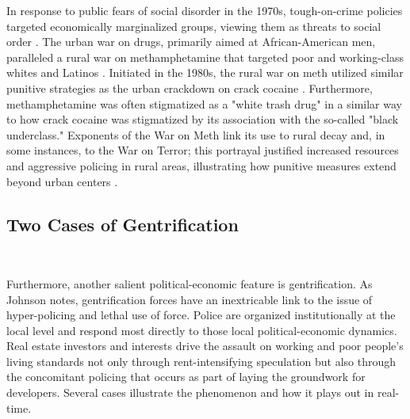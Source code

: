 \documentclass[12pt]{article}
\begin{document}
In response to public fears of social disorder in the 1970s, tough-on-crime policies targeted economically marginalized groups, viewing them as threats to social order \parencite{gottschalkCaughtCountrysideRace2020}. The urban war on drugs, primarily aimed at African-American men, paralleled a rural war on methamphetamine that targeted poor and working-class whites and Latinos \parencite{gottschalkCaughtCountrysideRace2020}. Initiated in the 1980s, the rural war on meth utilized similar punitive strategies as the urban crackdown on crack cocaine \parencite{gottschalkCaughtCountrysideRace2020}. Furthermore, methamphetamine was often stigmatized as a "white trash drug" in a similar way to how crack cocaine was stigmatized by its association with the so-called "black underclass." Exponents of the War on Meth link its use to rural decay and, in some instances, to the War on Terror; this portrayal justified increased resources and aggressive policing in rural areas, illustrating how punitive measures extend beyond urban centers \parencite{gottschalkCaughtCountrysideRace2020}.

\subsection{Two Cases of Gentrification}\

Furthermore, another salient political-economic feature is gentrification. As Johnson notes, gentrification forces have an inextricable link to the issue of hyper-policing and lethal use of force. Police are organized institutionally at the local level and respond most directly to those local political-economic dynamics. Real estate investors and interests drive the assault on working and poor people’s living standards not only through rent-intensifying speculation but also through the concomitant policing that occurs as part of laying the groundwork for developers. Several cases illustrate the phenomenon and how it plays out in real-time.
\end{document}
